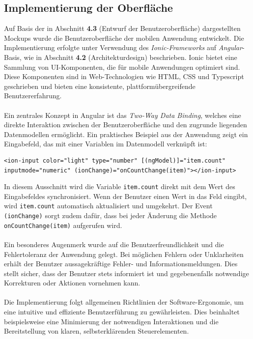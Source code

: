 \documentclass[a4paper,12pt]{article}
\begin{document}
\subsection{Implementierung der Oberfläche}
Auf Basis der in Abschnitt \textbf{4.3} (Entwurf der Benutzeroberfläche) dargestellten Mockups wurde die Benutzeroberfläche der mobilen Anwendung entwickelt. Die Implementierung erfolgte unter Verwendung des \textit{Ionic-Frameworks} auf \textit{Angular}-Basis, wie in Abschnitt \textbf{4.2} (Architekturdesign) beschrieben. Ionic bietet eine Sammlung von UI-Komponenten, die für mobile Anwendungen optimiert sind. Diese Komponenten sind in Web-Technologien wie HTML, CSS und Typescript geschrieben und bieten eine konsistente, plattformübergreifende Benutzererfahrung.\\
\\
Ein zentrales Konzept in Angular ist das \textit{Two-Way Data Binding}, welches eine direkte Interaktion zwischen der Benutzeroberfläche und den zugrunde liegenden Datenmodellen ermöglicht. Ein praktisches Beispiel aus der Anwendung zeigt ein Eingabefeld, das mit einer Variablen im Datenmodell verknüpft ist:
\begin{verbatim}
<ion-input color="light" type="number" [(ngModel)]="item.count" 
inputmode="numeric" (ionChange)="onCountChange(item)"></ion-input>
\end{verbatim}
In diesem Ausschnitt wird die Variable \texttt{item.count} direkt mit dem Wert des Eingabefeldes synchronisiert. Wenn der Benutzer einen Wert in das Feld eingibt, wird \texttt{item.count} automatisch aktualisiert und umgekehrt. Der Event \texttt{(ionChange)} sorgt zudem dafür, dass bei jeder Änderung die Methode \texttt{onCountChange(item)} aufgerufen wird.\\
\\
Ein besonderes Augenmerk wurde auf die Benutzerfreundlichkeit und die Fehlertoleranz der Anwendung gelegt. Bei möglichen Fehlern oder Unklarheiten erhält der Benutzer aussagekräftige Fehler- und Informationsmeldungen. Dies stellt sicher, dass der Benutzer stets informiert ist und gegebenenfalls notwendige Korrekturen oder Aktionen vornehmen kann.\\
\\
Die Implementierung folgt allgemeinen Richtlinien der Software-Ergonomie, um eine intuitive und effiziente Benutzerführung zu gewährleisten. Dies beinhaltet beispielsweise eine Minimierung der notwendigen Interaktionen und die Bereitstellung von klaren, selbsterklärenden Steuerelementen.
\end{document}
